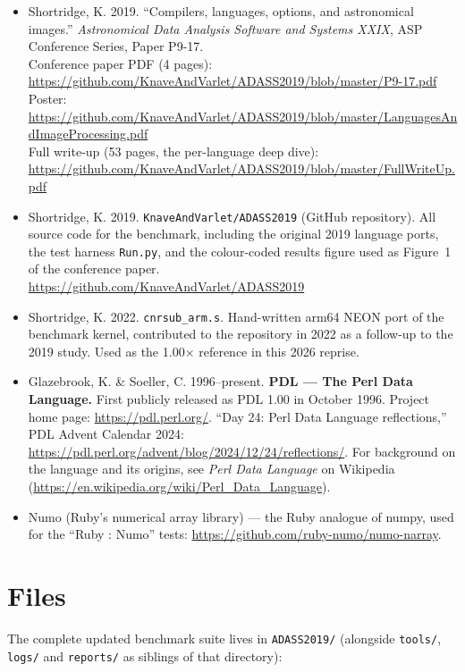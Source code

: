 \documentclass[11pt,a4paper]{article}
\begin{document}
\begin{itemize}\small
\item Shortridge, K. 2019. ``Compilers, languages, options, and
astronomical images.'' \emph{Astronomical Data Analysis Software and
Systems XXIX}, ASP Conference Series, Paper P9-17.\\[2pt]
Conference paper PDF (4 pages):
\url{https://github.com/KnaveAndVarlet/ADASS2019/blob/master/P9-17.pdf}\\
Poster:
\url{https://github.com/KnaveAndVarlet/ADASS2019/blob/master/LanguagesAndImageProcessing.pdf}\\
Full write-up (53 pages, the per-language deep dive):
\url{https://github.com/KnaveAndVarlet/ADASS2019/blob/master/FullWriteUp.pdf}
\item Shortridge, K. 2019. \texttt{KnaveAndVarlet/ADASS2019}
(GitHub repository). All source code for the benchmark, including
the original 2019 language ports, the test harness \texttt{Run.py},
and the colour-coded results figure used as Figure~1 of the
conference paper.\\
\url{https://github.com/KnaveAndVarlet/ADASS2019}
\item Shortridge, K. 2022. \texttt{cnrsub\_arm.s}. Hand-written
arm64 NEON port of the benchmark kernel, contributed to the
repository in 2022 as a follow-up to the 2019 study. Used as the
1.00$\times$ reference in this 2026 reprise.
\item Glazebrook, K. \& Soeller, C. 1996--present.
\textbf{PDL --- The Perl Data Language.} First publicly released as
PDL 1.00 in October 1996. Project home page:
\url{https://pdl.perl.org/}. ``Day 24: Perl Data Language
reflections,'' PDL Advent Calendar 2024:
\url{https://pdl.perl.org/advent/blog/2024/12/24/reflections/}.
For background on the language and its origins, see
\emph{Perl Data Language} on Wikipedia
(\url{https://en.wikipedia.org/wiki/Perl_Data_Language}).
\item Numo (Ruby's numerical array library) --- the Ruby analogue
of numpy, used for the ``Ruby : Numo'' tests:
\url{https://github.com/ruby-numo/numo-narray}.
\end{itemize}

\appendix
\section{Files}

The complete updated benchmark suite lives in
\texttt{ADASS2019/} (alongside \texttt{tools/}, \texttt{logs/} and
\texttt{reports/} as siblings of that directory):
\end{document}
